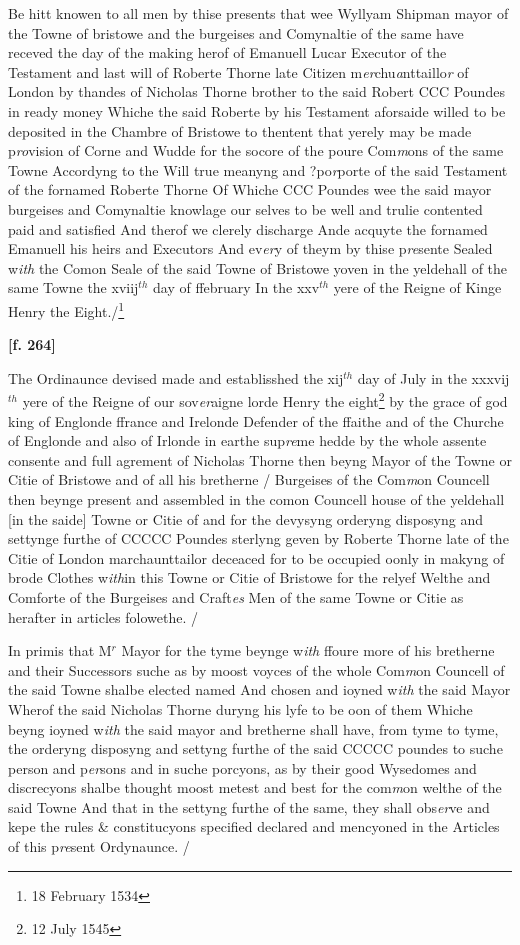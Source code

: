\documentclass[a4paper,12pt]{article}
\begin{document}
Be hitt knowen to all men by thise presents that wee Wyllyam Shipman mayor of the Towne of bristowe and the burgeises and Comynaltie of the same have receved the day of the making herof of Emanuell Lucar Executor of the Testament and last will of Roberte Thorne late Citizen m\textit{er}chu\textit{a}nttaillo\textit{r} of London by thandes of Nicholas Thorne brother to the said Robert CCC Poundes in ready money Whiche the said Roberte by his Testament aforsaide willed to be deposited in the Chambre of Bristowe to thentent that yerely may be made p\textit{ro}vision of Corne and Wudde for the socore of the poure Com\textit{m}ons of the same Towne Accordyng to the Will true meanyng and ?po\textit{r}porte of the said Testament of the fornamed Roberte Thorne Of Whiche CCC Poundes wee the said mayor burgeises and Comynaltie knowlage our selves to be well and trulie contented paid and satisfied And therof we clerely discharge Ande acquyte the fornamed Emanuell his heirs and Executors And ev\textit{er}y of theym by thise p\textit{re}sente Sealed w\textit{ith} the Comon Seale of the said Towne of Bristowe yoven in the yeldehall of the same Towne the xviij$^{th}$ day of ffebruary In the xxv$^{th}$ yere of the Reigne of Kinge Henry the Eight./\footnote{18 February 1534}

\textbf{[f. 264]}

The Ordinaunce devised made and establisshed the xij$^{th}$ day of July in the xxxvij$^{th}$ yere of the Reigne of our sov\textit{er}aigne lorde Henry the eight\footnote{12 July 1545} by the grace of god king of Englonde ffrance and Irelonde Defender of the ffaithe and of the Churche of Englonde and also of Irlonde in earthe sup\textit{re}me hedde by the whole assente consente and full agrement of Nicholas Thorne then beyng Mayor of the Towne or Citie of Bristowe and of all his bretherne / Burgeises of the Com\textit{m}on Councell then beynge present and assembled in the comon Councell house of the yeldehall [in the saide] Towne or Citie of and for the devysyng orderyng disposyng and settynge furthe of CCCCC Poundes sterlyng geven by Roberte Thorne late of the Citie of London marchaunttailor deceaced for to be occupied oonly in makyng of brode Clothes w\textit{ith}in this Towne or Citie of Bristowe for the relyef Welthe and Comforte of the Burgeises and Craft\textit{es} Men of the same Towne or Citie as herafter in articles folowethe. /

In primis that M$^{r}$ Mayor for the tyme beynge w\textit{ith} ffoure more of his bretherne and their Successors suche as by moost voyces of the whole Com\textit{m}on Councell of the said Towne shalbe elected named And chosen and ioyned w\textit{ith} the said Mayor Wherof the said Nicholas Thorne duryng his lyfe to be oon of them Whiche beyng ioyned w\textit{ith} the said mayor and bretherne shall have, from tyme to tyme, the orderyng disposyng and settyng furthe of the said CCCCC poundes to suche person and p\textit{er}sons and in suche porcyons, as by their good Wysedomes and discrecyons shalbe thought moost metest and best for the com\textit{m}on welthe of the said Towne And that in the settyng furthe of the same, they shall obs\textit{er}ve and kepe the rules \& constitucyons specified declared and mencyoned in the Articles of this p\textit{re}sent Ordynaunce. /
\end{document}
